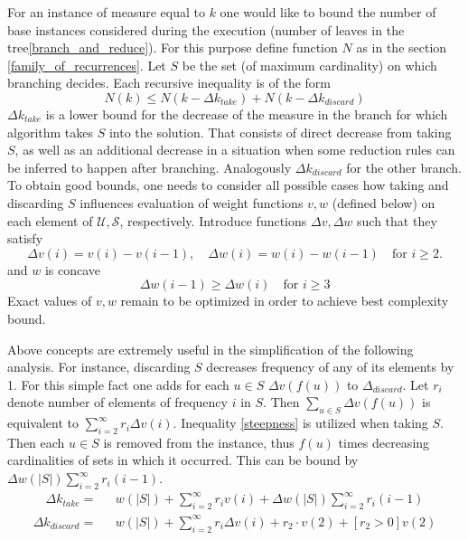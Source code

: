 For an instance of measure equal to $k$ one would like to bound the number of base instances considered during the execution (number of leaves in the tree\ref{branch_and_reduce}). For this purpose define function $N$ as in the section \ref{family_of_recurrences}. Let $S$ be the set (of maximum cardinality) on which branching decides. Each recursive inequality is of the form
$$
N(k) \leq N(k - \Delta k_{take}) + N(k - \Delta k_{discard})
$$
$\Delta k_{take}$ is a lower bound for the decrease of the measure in the branch for which algorithm takes $S$ into the solution. That consists of direct decrease from taking $S$, as well as an additional decrease in a situation when some reduction rules can be inferred to happen after branching. Analogously $\Delta k_{discard}$ for the other branch. To obtain good bounds, one needs to consider all possible cases how taking and discarding $S$ influences evaluation of weight functions $v, w$ (defined below) on each element of $\mathcal{U}, \mathcal{S}$, respectively.   
Introduce functions $\Delta v, \Delta w$ such that they satisfy
$$
\Delta v(i) = v(i) - v(i - 1), \quad \Delta w(i) = w(i) - w(i - 1) \quad \text{for } i \geq 2.
$$
and $w$ is concave
\begin{equation}\label{steepness}
    \Delta w(i - 1) \geq \Delta w(i) \quad \text{for } i\geq 3
\end{equation}
Exact values of $v, w$ remain to be optimized in order to achieve best complexity bound. 
\par Above concepts are extremely useful in the simplification of the following analysis. For instance, discarding $S$ decreases frequency of any of its elements by 1. For this simple fact one adds for each $u\in S$ $\Delta v(f(u))$ to $\Delta_{discard}$. Let $r_i$ denote number of elements of frequency $i$ in $S$. Then $\sum_{u\in S} \Delta v(f(u))$ is equivalent to $\sum_{i=2}^\infty r_i \Delta v(i)$. Inequality \ref{steepness} is utilized when taking $S$. Then each $u\in S$ is removed from the instance, thus $f(u)$ times decreasing cardinalities of sets in which it occurred. This can be bound by $\Delta w(|S|)\sum_{i = 2}^\infty r_i(i - 1)$.
\begin{equation*}
    \begin{split}
        \Delta k_{take} = 
        &\text{ } w(|S|) + \sum_{i = 2}^\infty r_i v(i) + \Delta w(|S|)\sum_{i = 2}^\infty r_i(i - 1)
    \end{split}
\end{equation*}
\begin{equation*}
    \begin{split}
        \Delta k_{discard} =
        &\text{ } w(|S|) + \sum_{i = 2}^\infty r_i \Delta v(i) + r_2 \cdot v(2) + [r_2 > 0] v(2) 
    \end{split}
\end{equation*}

